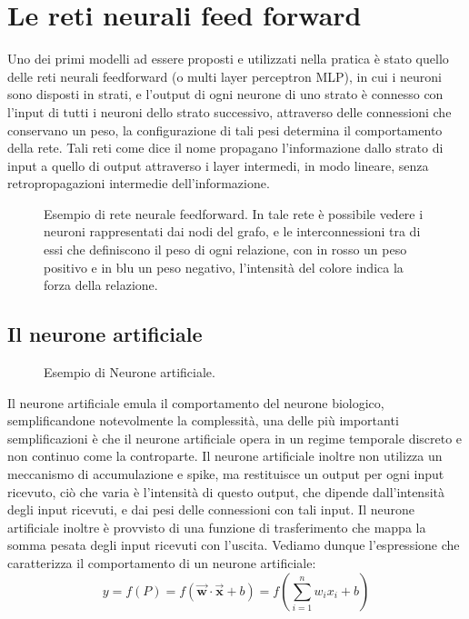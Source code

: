 \section{Le reti neurali feed forward}

Uno dei primi modelli ad essere proposti e utilizzati nella pratica è stato quello delle reti neurali feedforward (o multi layer perceptron MLP),
in cui i neuroni sono disposti in strati, e l'output di ogni neurone di uno strato è connesso con l'input di tutti i neuroni dello strato successivo, 
attraverso delle connessioni che conservano un peso, la configurazione di tali pesi determina il comportamento della rete.
Tali reti come dice il nome propagano l'informazione dallo strato di input a quello di output attraverso i layer intermedi,
in modo lineare, senza retropropagazioni intermedie dell'informazione.

    \begin{figure}[H]
        \centering
        
        \caption{Esempio di rete neurale feedforward. In tale rete è possibile vedere i neuroni rappresentati dai nodi del grafo, e
        le interconnessioni tra di essi che definiscono il peso di ogni relazione, con in rosso un peso positivo e in blu un peso negativo,
        l'intensità del colore indica la forza della relazione.}
        \label{fig:feedforward_nn}
    \end{figure}

\subsection{Il neurone artificiale}

    \begin{figure}
        \centering
        \vspace{-25pt}
        
        \caption{Esempio di Neurone artificiale.}
        \label{fig:artificial_neuron}
        \vspace{0pt}
    \end{figure}

Il neurone artificiale emula il comportamento del neurone biologico, semplificandone notevolmente la complessità,
una delle più importanti semplificazioni è che il neurone artificiale opera in un regime temporale discreto e non continuo come la controparte.
Il neurone artificiale inoltre non utilizza un meccanismo di accumulazione e spike, ma restituisce un output per ogni input ricevuto,
ciò che varia è l'intensità di questo output, che dipende dall'intensità degli input ricevuti, e dai pesi delle connessioni con tali input.
Il neurone artificiale inoltre è provvisto di una funzione di trasferimento che mappa la somma pesata degli input ricevuti con l'uscita.
Vediamo dunque l'espressione che caratterizza il comportamento di un neurone artificiale:
\begin{equation}
    \label{eq:neuron}
    y = f(P) = f(\vec{\mathbf{w}} \cdot \vec{\mathbf{x}} + b) = f(\sum_{i=1}^{n} w_i x_i + b)
\end{equation}


